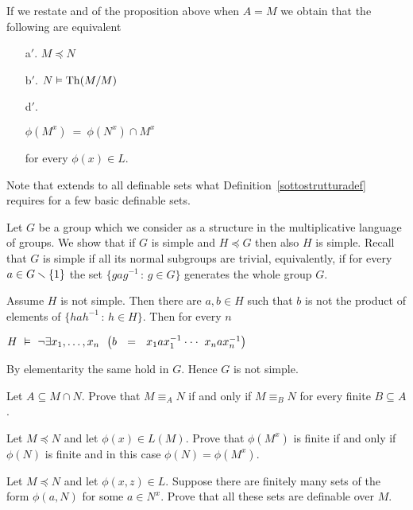 If we restate  and  of the proposition above when $A=M$ we obtain that the following are equivalent
\begin{itemize}
\item[a$'$.] $M\preceq N$
\item[b$'$.] $N\vDash{\rm Th}(M/M)$
\item[d$'$.] \parbox{26ex}{$\phi(M^x)\ =\ \phi(N^x) \cap M^x$} for every $\phi(x)\in L$.
\end{itemize}
Note that  extends to all definable sets what Definition~\ref{sottostrutturadef} requires for a few basic definable sets.

\begin{example}
Let $G$ be a group which we consider as a structure in the multiplicative language of groups.
We show that if $G$ is simple and $H\preceq G$ then also $H$ is simple.
Recall that $G$ is simple if all its normal subgroups are trivial, equivalently, if for every $a\in G\smallsetminus \{1\}$ the set $\big\{gag^{-1}\,:\,g\in G\big\}$ generates the whole group $G$.


Assume $H$ is not simple.
Then there are $a,b\in H$ such that $b$ is not the product of elements of $\big\{hah^{-1}\,:\,h\in H\big\}$.
Then for every $n$ 

\hfil$H\ \models\ \neg\E x_1,\dots,x_n\ \ \big(b\ \ =\ \ x_1ax_1^{-1}\cdot\cdot\cdot\ x_nax_n^{-1}\big)$

By elementarity the same hold in $G$.
Hence $G$ is not simple.
\end{example}


\begin{exercise}\label{ex_finitanaturaeqel}
Let $A\subseteq M\cap N$.
Prove that $M\equiv_A N$ if and only if $M\equiv_B N$ for every finite $B\subseteq A$.
\end{exercise}

\begin{exercise}\label{ex_finite_elemenrary}
Let $M\preceq N$ and let $\phi(x)\in L(M)$.
Prove that $\phi(M^x)$ is finite if and only if $\phi(N)$ is finite and in this case $\phi(N)=\phi(M^x)$.
\end{exercise}

\begin{exercise}\label{ex_finite_fam_sets}
Let $M\preceq N$ and let $\phi(x,z)\in L$.
Suppose there are finitely many sets of the form $\phi(a,N)$ for some $a\in N^x$.
Prove that all these sets are definable over $M$.
\end{exercise}

